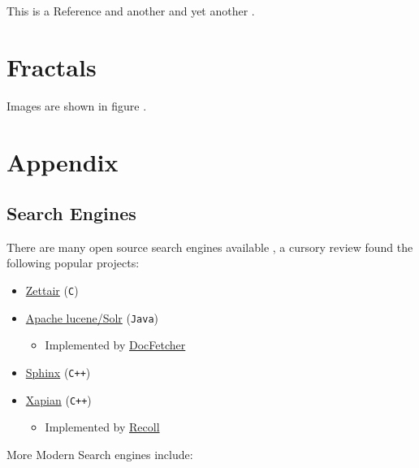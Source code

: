 \documentclass[a4paper,11pt,twoside]{article}
\begin{document}
This is a Reference \cite{tuGraphBasedSemiSupervisedNearestNeighbor2016a} and another \cite{nicodemiIntroductionAbstractAlgebra2007a} and yet another \cite{christopherburgesRankNetLambdaRankLambdaMART2010}.

\section{Fractals}
\label{sec:org924e722}
Images are shown in figure .

\section{Appendix}
\label{sec:org732feeb}

\subsection{Search Engines}
\label{sec:org33d4c66}
There are many open source search engines available , a cursory review
found the following popular projects:

\begin{itemize}
\item \href{https://github.com/cyclaero/zettair}{Zettair} (\texttt{C}) \cite{jansenCyclaeroZettair2020}
\item \href{https://github.com/apache/lucene-solr}{Apache lucene/Solr} (\texttt{Java}) \cite{apachesoftwarefoundationLearningRankApache2017}
\begin{itemize}
\item Implemented by \href{https://sourceforge.net/p/docfetcher/code/ci/master/tree/}{DocFetcher} \cite{docfetcherdevelopmentteamDocFetcherFastDocument}
\end{itemize}
\item \href{https://github.com/sphinxsearch/sphinx}{Sphinx} (\texttt{C++}) \cite{yurischapovSphinxsearchSphinx2021}
\item \href{https://github.com/kevinduraj/xapian-search}{Xapian} (\texttt{C++}) \cite{ollybettsXapianXapian2021}
\begin{itemize}
\item Implemented by \href{https://www.lesbonscomptes.com/recoll/}{Recoll} \cite{jean-francoisdockesRecollUserManual}
\end{itemize}
\end{itemize}

More Modern Search engines include:
\end{document}

